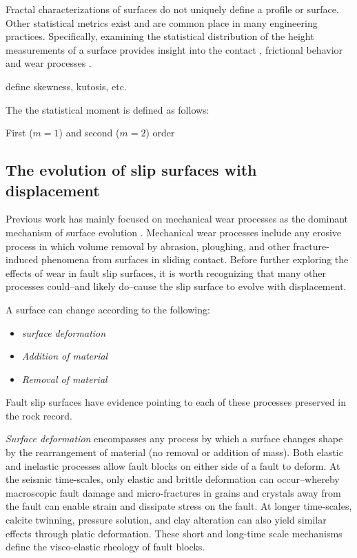 \documentclass[12pt,a4paper]{article}
\begin{document}
Fractal characterizations of surfaces do not uniquely define a profile or surface. Other statistical metrics exist and are common place in many engineering practices. Specifically, examining the statistical distribution of the height measurements of a surface provides insight into the contact \cite{greenwood1966}, frictional behavior \cite{XXX} and wear processes \cite{archard1953contact}.

define skewness, kutosis, etc.

The the statistical moment is defined as follows:

First ($m=1$) and second ($m=2$) order  



\subsection{The evolution of slip surfaces with displacement}

Previous work has mainly focused on mechanical wear processes as the dominant mechanism of surface evolution \cite{power1988roughness, sagy2007evolution, brodsky2011faults}. Mechanical wear processes include any erosive process in which volume removal by abrasion,  ploughing, and other fracture-induced phenomena from surfaces in sliding contact. Before further exploring the effects of wear in fault slip surfaces, it is worth recognizing that many other processes could--and likely do--cause the slip surface to evolve with displacement.

A surface can change according to the following:

\begin{itemize}
	\item[] \textit{surface deformation}
	\item[] \textit{Addition of material}
	\item[] \textit{Removal of material}
\end{itemize}

Fault slip surfaces have evidence pointing to each of these processes preserved in the rock record.

\textit{Surface deformation} encompasses any process by which a surface changes shape by the rearrangement of material (no removal or addition of mass). Both elastic and inelastic processes allow fault blocks on either side of a fault to deform. At the seismic time-scales, only elastic and brittle deformation can occur--whereby macroscopic fault damage and micro-fractures in grains and crystals away from the fault can enable strain and dissipate stress on the fault. At longer time-scales, calcite twinning, pressure solution, and clay alteration can also yield similar effects through platic deformation. These short and long-time scale mechanisms define the visco-elastic rheology of fault blocks.
\end{document}

